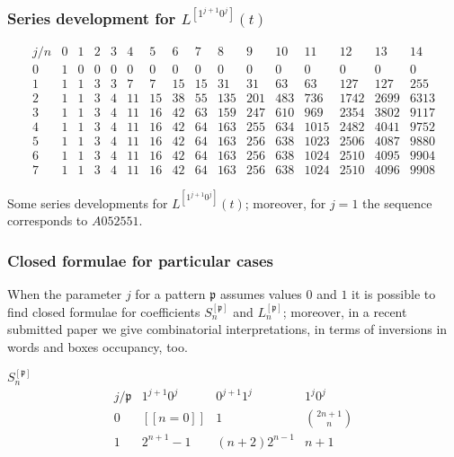 \documentclass{beamer}
\begin{document}
\begin{frame}\frametitle{Series development for $L^{[1^{j+1}0^{j}]}(t)$}
{\tiny
\begin{table}
\begin{equation*}\begin{array}{c|ccccccccccccccc}j/n & 0 & 1 & 2 & 3 & 4 & 5 & 6 & 7 & 8 & 9 & 10 & 11 & 12 & 13 & 14\\\hline0 & 1 & 0 & 0 & 0 & 0 & 0 & 0 & 0 & 0 & 0 & 0 & 0 & 0 & 0 & 0\\1 & 1 & 1 & 3 & 3 & 7 & 7 & 15 & 15 & 31 & 31 & 63 & 63 & 127 & 127 & 255\\2 & 1 & 1 & 3 & 4 & 11 & 15 & 38 & 55 & 135 & 201 & 483 & 736 & 1742 & 2699 & 6313\\3 & 1 & 1 & 3 & 4 & 11 & 16 & 42 & 63 & 159 & 247 & 610 & 969 & 2354 & 3802 & 9117\\4 & 1 & 1 & 3 & 4 & 11 & 16 & 42 & 64 & 163 & 255 & 634 & 1015 & 2482 & 4041 & 9752\\5 & 1 & 1 & 3 & 4 & 11 & 16 & 42 & 64 & 163 & 256 & 638 & 1023 & 2506 & 4087 & 9880\\6 & 1 & 1 & 3 & 4 & 11 & 16 & 42 & 64 & 163 & 256 & 638 & 1024 & 2510 & 4095 & 9904\\7 & 1 & 1 & 3 & 4 & 11 & 16 & 42 & 64 & 163 & 256 & 638 & 1024 & 2510 & 4096 & 9908\end{array}\end{equation*}
\caption{Some series developments for $L^{[1^{j+1}0^j]}(t)$; moreover, for
$j=1$ the sequence corresponds to $A052551$.}
\end{table}
}
\end{frame}
\begin{frame}\frametitle{Closed formulae for particular cases}

When the parameter $j$ for a pattern $\mathfrak{p}$ assumes values $0$ and $1$
it is possible to find closed formulae for coefficients
$S_{n}^{[\mathfrak{p}]}$ and $L_{n}^{[\mathfrak{p}]}$; moreover, in a recent
submitted paper we give combinatorial interpretations, in terms of inversions
in words and boxes occupancy, too.

\begin{block}{$S_{n}^{[\mathfrak{p}]}$}
\begin{displaymath}
\begin{array}{c|ccc}
j/\mathfrak{p} & {1^{j+1}0^{j}} & {0^{j+1}1^{j}} & {1^{j}0^{j}} \\
\hline
0 &  [\![n = 0]\!] &  1 & { {2n+1}\choose{n} } \\
1 &  2^{n+1} -1 &  (n+2)2^{n-1} & n+1 \\
\end{array}{}
\end{displaymath}
\end{block}
\end{frame}
\end{document}
